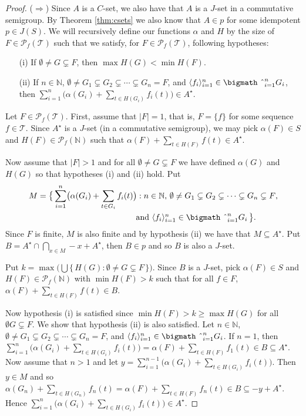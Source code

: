 \documentclass[12pt,showtrims]{memoir}
\theoremstyle{plain}
\theoremstyle{definition}
\newcommand{\la}{\langle}
\newcommand{\ra}{\rangle}
\newcommand{\bbN}{\mathbb{N}}
\newcommand{\calT}{\mathcal{T}}
\newcommand{\Pf}{\mathcal{P}_f}
\newcommand{\bigtimes}{\hbox{\bigmath \char'2}}
\begin{document}
\begin{proof}
  ($\Rightarrow$)
  Since $A$ is a $C$-set, we also have that $A$ is a $J$-set in a commutative semigroup.
  By Theorem \ref{thm:csets} we also know that $A \in p$ for some idempotent $p \in J(S)$. 
  We will recursively define our functions $\alpha$ and $H$ by the size of $F \in \Pf(\calT)$ such that we satisfy, for $F \in \Pf(\calT)$, following hypotheses:
  \begin{itemize}
    \item[(i)] If $\emptyset \ne G \subsetneq F$, then $\max H(G) < \min H(F)$.
      
    \item[(ii)] If $n \in \bbN$, $\emptyset \ne G_1 \subsetneq G_2 \subsetneq \cdots \subsetneq G_n = F$, and $\la f_i \ra_{i=1}^n \in \bigtimes_{i=1}^n G_i$, then $\sum_{i=1}^n\bigl( \alpha(G_i) + \sum_{t \in H(G_i)} f_i(t)\bigr) \in A^\star$. 
  \end{itemize}
  
  Let $F \in \Pf(\calT)$.
  First, assume that $|F| = 1$, that is, $F = \{f\}$ for some sequence $f \in \calT$.
  Since $A^\star$ is a $J$-set (in a commutative semigroup), we may pick $\alpha(F) \in S$ and $H(F) \in \Pf(\bbN)$ such that $\alpha(F) + \sum_{t \in H(F)} f(t) \in A^\star$.

  Now assume that $|F| > 1$ and for all $\emptyset \ne G \subsetneq F$ we have defined $\alpha(G)$ and $H(G)$ so that hypotheses (i) and (ii) hold.
  Put
  \begin{align*}
    M &= \bigl\{\, \sum_{i=1}^n \bigl( \alpha(G_i) + \sum_{t \in G_i} f_i(t) \bigr) : \mbox{$n \in \bbN$, $\emptyset \ne G_1 \subsetneq G_2 \subsetneq \cdots \subsetneq G_n \subsetneq F$,} \\
    &\hspace{12em} \mbox{and $\la f_i \ra_{i=1}^n \in \bigtimes_{i=1}^n G_i$} \,\bigr\}.
  \end{align*}
  Since $F$ is finite, $M$ is also finite and by hypothesis (ii) we have that $M \subseteq A^\star$.
  Put $B = A^\star \cap \bigcap_{x \in M} -x+A^\star$, then $B \in p$ and so $B$ is also a $J$-set.

  Put $k = \max \bigl( \bigcup\{\, H(G) : \emptyset \ne G \subsetneq F\,\} \bigr)$.
  Since $B$ is a $J$-set, pick $\alpha(F) \in S$ and $H(F) \in \Pf(\bbN)$ with $\min H(F) > k$ such that for all $f \in F$, $\alpha(F) + \sum_{t \in H(F)} f(t) \in B$. 

  Now hypothesis (i) is satisfied since $\min H(F) > k \ge \max H(G)$ for all $\emptyset G \subsetneq F$. 
  We show that hypothesis (ii) is also satisfied.
  Let $n \in \bbN$, $\emptyset \ne G_1 \subsetneq G_2 \subsetneq \cdots \subsetneq G_n = F$, and $\la f_i \ra_{i=1}^n \in \bigtimes_{i=1}^n G_i$. 
  If $n = 1$, then $\sum_{i=1}^n \bigl( \alpha(G_i) + \sum_{t \in H(G_i)} f_i(t)\bigr) = \alpha(F) + \sum_{t \in H(F)} f_1(t) \in B \subseteq A^\star$. 
  Now assume that $n > 1$ and let $y = \sum_{i=1}^{n-1}\bigl( \alpha(G_i) + \sum_{t \in H(G_i)} f_i(t) \bigr)$.
  Then $y \in M$ and so $\alpha(G_n) + \sum_{t \in H(G_n)} f_n(t) = \alpha(F) + \sum_{t \in H(F)} f_n(t) \in B \subseteq -y + A^\star$. 
  Hence $\sum_{i=1}^n\bigl( \alpha(G_i) + \sum_{t \in H(G_i)} f_i(t) \bigr) \in A^\star$.


\end{proof}
\end{document}
